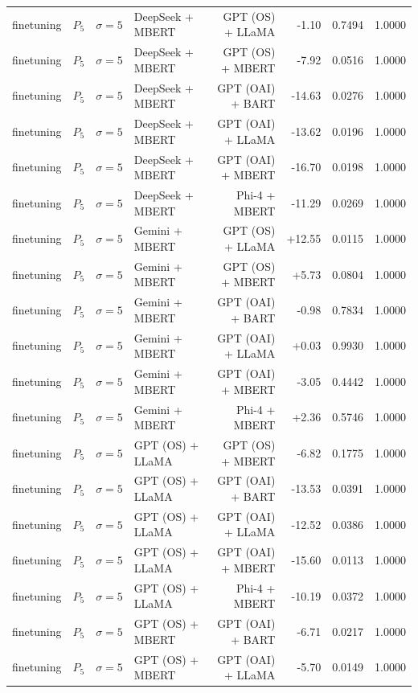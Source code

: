 \begin{table}[htbp]
\begin{tabular*}{\textwidth}{@{\extracolsep{\fill}}llllrrrl}
finetuning & $P_5$ & $\sigma{=}5$ & DeepSeek + MBERT & GPT (OS) + LLaMA & -1.10 & 0.7494 & 1.0000 \\
finetuning & $P_5$ & $\sigma{=}5$ & DeepSeek + MBERT & GPT (OS) + MBERT & -7.92 & 0.0516 & 1.0000 \\
finetuning & $P_5$ & $\sigma{=}5$ & DeepSeek + MBERT & GPT (OAI) + BART & -14.63 & 0.0276 & 1.0000 \\
finetuning & $P_5$ & $\sigma{=}5$ & DeepSeek + MBERT & GPT (OAI) + LLaMA & -13.62 & 0.0196 & 1.0000 \\
finetuning & $P_5$ & $\sigma{=}5$ & DeepSeek + MBERT & GPT (OAI) + MBERT & -16.70 & 0.0198 & 1.0000 \\
finetuning & $P_5$ & $\sigma{=}5$ & DeepSeek + MBERT & Phi-4 + MBERT & -11.29 & 0.0269 & 1.0000 \\
finetuning & $P_5$ & $\sigma{=}5$ & Gemini + MBERT & GPT (OS) + LLaMA & +12.55 & 0.0115 & 1.0000 \\
finetuning & $P_5$ & $\sigma{=}5$ & Gemini + MBERT & GPT (OS) + MBERT & +5.73 & 0.0804 & 1.0000 \\
finetuning & $P_5$ & $\sigma{=}5$ & Gemini + MBERT & GPT (OAI) + BART & -0.98 & 0.7834 & 1.0000 \\
finetuning & $P_5$ & $\sigma{=}5$ & Gemini + MBERT & GPT (OAI) + LLaMA & +0.03 & 0.9930 & 1.0000 \\
finetuning & $P_5$ & $\sigma{=}5$ & Gemini + MBERT & GPT (OAI) + MBERT & -3.05 & 0.4442 & 1.0000 \\
finetuning & $P_5$ & $\sigma{=}5$ & Gemini + MBERT & Phi-4 + MBERT & +2.36 & 0.5746 & 1.0000 \\
finetuning & $P_5$ & $\sigma{=}5$ & GPT (OS) + LLaMA & GPT (OS) + MBERT & -6.82 & 0.1775 & 1.0000 \\
finetuning & $P_5$ & $\sigma{=}5$ & GPT (OS) + LLaMA & GPT (OAI) + BART & -13.53 & 0.0391 & 1.0000 \\
finetuning & $P_5$ & $\sigma{=}5$ & GPT (OS) + LLaMA & GPT (OAI) + LLaMA & -12.52 & 0.0386 & 1.0000 \\
finetuning & $P_5$ & $\sigma{=}5$ & GPT (OS) + LLaMA & GPT (OAI) + MBERT & -15.60 & 0.0113 & 1.0000 \\
finetuning & $P_5$ & $\sigma{=}5$ & GPT (OS) + LLaMA & Phi-4 + MBERT & -10.19 & 0.0372 & 1.0000 \\
finetuning & $P_5$ & $\sigma{=}5$ & GPT (OS) + MBERT & GPT (OAI) + BART & -6.71 & 0.0217 & 1.0000 \\
finetuning & $P_5$ & $\sigma{=}5$ & GPT (OS) + MBERT & GPT (OAI) + LLaMA & -5.70 & 0.0149 & 1.0000 \\

\end{tabular*}
\end{table}
